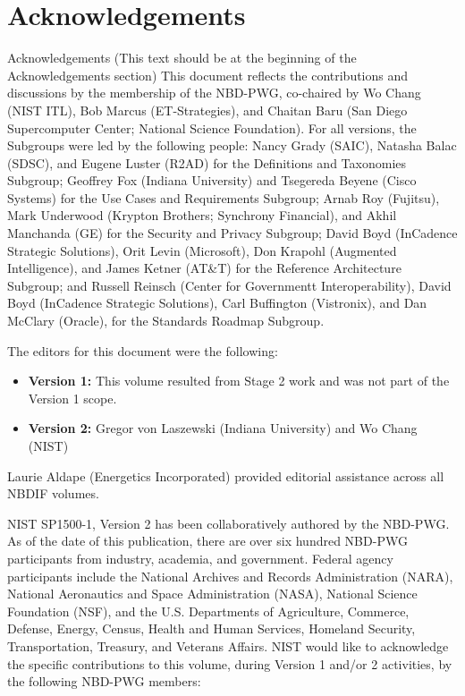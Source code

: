\section*{\hfill Acknowledgements \hfill}


Acknowledgements (This text should be at the beginning of the Acknowledgements section)
This document reflects the contributions and discussions by the membership of the NBD-PWG, co-chaired by Wo Chang (NIST ITL), Bob Marcus (ET-Strategies), and Chaitan Baru (San Diego Supercomputer Center; National Science Foundation). For all versions, the Subgroups were led by the following people: Nancy Grady (SAIC), Natasha Balac (SDSC), and Eugene Luster (R2AD) for the Definitions and Taxonomies Subgroup; Geoffrey Fox (Indiana University) and Tsegereda Beyene (Cisco Systems) for the Use Cases and Requirements Subgroup; Arnab Roy (Fujitsu), Mark Underwood (Krypton Brothers; Synchrony Financial), and Akhil Manchanda (GE) for the Security and Privacy Subgroup; David Boyd (InCadence Strategic Solutions), Orit Levin (Microsoft), Don Krapohl (Augmented Intelligence), and James Ketner (AT\&T) for the Reference Architecture Subgroup; and Russell Reinsch (Center for Governmentt Interoperability), David Boyd (InCadence Strategic Solutions), Carl Buffington (Vistronix), and Dan McClary (Oracle), for the Standards Roadmap Subgroup.

The editors for this document were the following: 

\begin{itemize} 

\item {\bf Version 1:} This volume resulted from Stage 2 work and was
  not part of the Version 1 scope.

\item {\bf Version 2:} Gregor von Laszewski (Indiana University) and
  Wo Chang (NIST) \end{itemize}

Laurie Aldape (Energetics Incorporated) provided editorial assistance
across all NBDIF volumes.

NIST SP1500-1, Version 2 has been collaboratively authored by the NBD-PWG. As of the date of this publication, there are over six hundred NBD-PWG participants from industry, academia, and government. Federal agency participants include the National Archives and Records Administration (NARA), National Aeronautics and Space Administration (NASA), National Science Foundation (NSF), and the U.S. Departments of Agriculture, Commerce, Defense, Energy, Census, Health and Human Services, Homeland Security, Transportation, Treasury, and Veterans Affairs.  NIST would like to acknowledge the specific contributions to this volume, during Version 1 and/or 2 activities, by the following NBD-PWG members:

